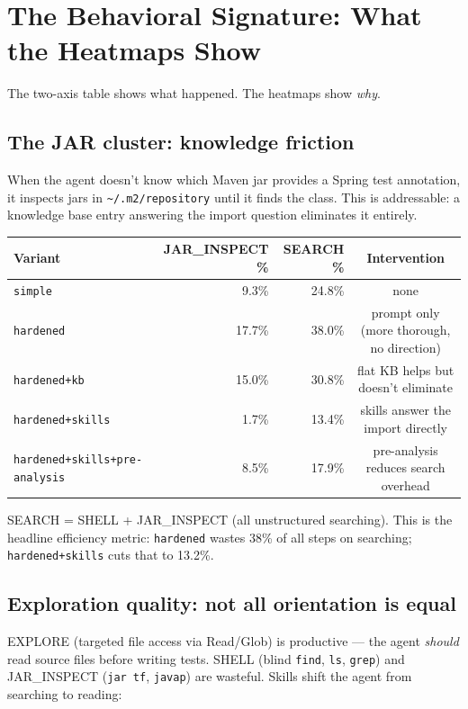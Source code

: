 \documentclass[11pt,a4paper]{article}
\begin{document}
\section{The Behavioral Signature: What the Heatmaps Show}

The two-axis table shows what happened. The heatmaps show \emph{why}.

\subsection*{The JAR cluster: knowledge friction}

When the agent doesn't know which Maven jar provides a Spring test annotation,
it inspects jars in \texttt{\textasciitilde/.m2/repository} until it finds the class.
This is addressable: a knowledge base entry answering the import question
eliminates it entirely.

\begin{center}
\begin{tabular}{@{}lrrc@{}}
\toprule
\textbf{Variant} & \textbf{JAR\_INSPECT \%} & \textbf{SEARCH \%} & \textbf{Intervention} \\
\midrule
\texttt{simple}              &  9.3\% & 24.8\% & none \\
\texttt{hardened}            & 17.7\% & 38.0\% & prompt only (more thorough, no direction) \\
\texttt{hardened+kb}         & 15.0\% & 30.8\% & flat KB helps but doesn't eliminate \\
\texttt{hardened+skills}     &  1.7\% & 13.4\% & skills answer the import directly \\
\texttt{hardened+skills+pre-analysis} &  8.5\% & 17.9\% & pre-analysis reduces search overhead \\
\bottomrule
\end{tabular}
\end{center}

SEARCH = SHELL + JAR\_INSPECT (all unstructured searching). This is the headline efficiency
metric: \texttt{hardened} wastes 38\% of all steps on searching; \texttt{hardened+skills}
cuts that to 13.2\%.

\subsection*{Exploration quality: not all orientation is equal}

EXPLORE (targeted file access via Read/Glob) is productive --- the agent \emph{should}
read source files before writing tests. SHELL (blind \texttt{find}, \texttt{ls}, \texttt{grep})
and JAR\_INSPECT (\texttt{jar tf}, \texttt{javap}) are wasteful.
Skills shift the agent from searching to reading:
\end{document}
